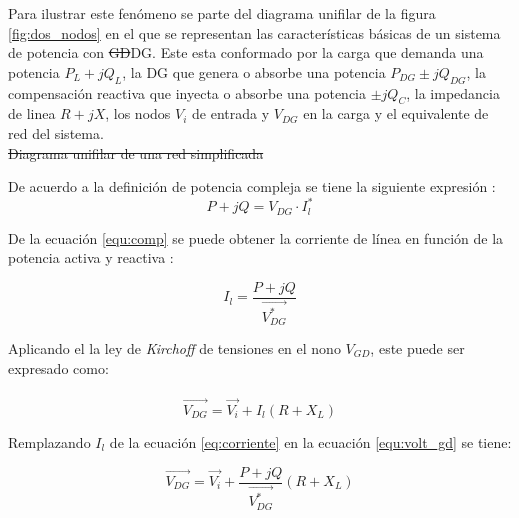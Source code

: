 \documentclass[12pt, letterpaper]{report}
\providecommand{\DIFdeltex}[1]{{\protect\color{red}\sout{#1}}}                      %
\providecommand{\DIFaddbegin}{} %
\providecommand{\DIFaddend}{} %
\providecommand{\DIFdelbegin}{} %
\providecommand{\DIFdelend}{} %
\providecommand{\DIFdelFL}[1]{\DIFdel{#1}} %
\providecommand{\DIFdel}[1]{\texorpdfstring{\DIFdeltex{#1}}{}} %
\begin{document}
\DIFaddend Para ilustrar este fenómeno se parte  del diagrama unifilar de la figura \ref{fig:dos_nodos} en el que se representan las características básicas de un sistema de potencia con \DIFdelbegin \DIFdel{GD}\DIFdelend \DIFaddbegin \ac{DG}\DIFaddend . Este esta conformado por la carga que demanda una potencia $P_{L}+jQ_{L}$, la DG que genera o absorbe una potencia $P_{DG}\pm jQ_{DG}$,  la compensación reactiva que inyecta o absorbe una potencia $\pm jQ_{C}$, la impedancia de linea $R+jX$,  los nodos $V_{i} $ de entrada y $V_{DG}$ en la carga y el equivalente de red del sistema.\\
\DIFdelbegin %
{%
\DIFdelFL{Diagrama unifilar de una red simplificada}}
\DIFdelend \DIFaddbegin 

\DIFaddend De acuerdo a la definición de potencia compleja se tiene la siguiente expresión \cite{Akagi2017}:\DIFaddbegin \\
\DIFaddend 

\begin{equation}
\label{equ:comp}
P + jQ = V_{DG} \cdot I_{l}^{*}
\end{equation}
\DIFaddbegin 

\DIFaddend De la ecuación \ref{equ:comp}  se puede obtener  la corriente de línea en función de la potencia activa y reactiva :

\begin{equation}
I_{l}= \dfrac{P + jQ}{\overrightarrow{V_{DG}^{*}}}
\label{eq:corriente}
\end{equation}

Aplicando el la ley de \textit{ Kirchoff } de tensiones en el nono  $V_{GD}$, este  puede ser expresado como:\\\\
\begin{equation}
\label{equ:volt_gd}
\overrightarrow{V_{DG}}= \overrightarrow{V_{i}} + I_{l}(R + X_{L})
\end{equation}

Remplazando $ I_{l} $ de  la ecuación \ref{eq:corriente} en la ecuación  \ref{equ:volt_gd} se tiene:

\[\overrightarrow{V_{DG}}= \overrightarrow{V_{i}} + \dfrac{P + jQ}{\overrightarrow{V_{DG}^{*}}}(R + X_{L})\]
\DIFaddbegin 
\end{document}
